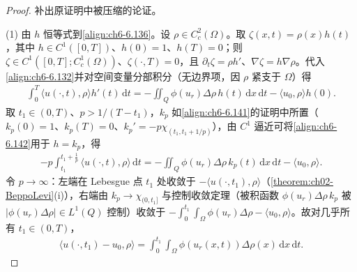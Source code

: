 \documentclass[../../main.tex]{subfiles}%
\begin{document}
\begin{proof}
补出原证明中被压缩的论证。

(1) 由 $h$ 恒等式到\eqref{align:ch6-6.136}。设 $\rho\in C^2_c(\Omega)$。取 $\zeta(x,t)=\rho(x)h(t)$，其中 $h\in C^1([0,T])$、$h(0)=1$、$h(T)=0$；则 $\zeta\in C^1([0,T];C^1_c(\Omega))$、$\zeta(\cdot,T)=0$，且 $\partial_t\zeta=\rho h'$、$\nabla\zeta=h\nabla\rho$。代入\eqref{align:ch6-6.132}并对空间变量分部积分（无边界项，因 $\rho$ 紧支于 $\Omega$）得
\begin{align}
\int_0^T\langle u(\cdot,t),\rho\rangle h'(t)\,\mathrm{d}t
=-\iint_Q\phi(u_r)\Delta\rho\,h(t)\,\mathrm{d}x\,\mathrm{d}t-\langle u_0,\rho\rangle h(0). \label{align:ch6-6.142}
\end{align}
取 $t_1\in(0,T)$、$p>1/(T-t_1)$，$k_p$ 如\eqref{align:ch6-6.141}的证明中所置（$k_p(0)=1$、$k_p(T)=0$、$k_p'=-p\chi_{(t_1,t_1+1/p)}$），由 $C^1$ 逼近可将\eqref{align:ch6-6.142}用于 $h=k_p$，得
\begin{align*}
-p\int_{t_1}^{t_1+\frac{1}{p}}\langle u(\cdot,t),\rho\rangle\,\mathrm{d}t
=-\iint_Q\phi(u_r)\Delta\rho\,k_p(t)\,\mathrm{d}x\,\mathrm{d}t-\langle u_0,\rho\rangle .
\end{align*}
令 $p\to\infty$：左端在 Lebesgue 点 $t_1$ 处收敛于 $-\langle u(\cdot,t_1),\rho\rangle$（\cref{theorem:ch02-BeppoLevi}(i)），右端由 $k_p\to\chi_{(0,t_1]}$ 与控制收敛定理（被积函数 $\phi(u_r)\Delta\rho\,k_p$ 被 $|\phi(u_r)\Delta\rho|\in L^1(Q)$ 控制）收敛于 $-\int_0^{t_1}\int_\Omega\phi(u_r)\Delta\rho-\langle u_0,\rho\rangle$。故对几乎所有 $t_1\in(0,T)$，
\begin{align*}
\langle u(\cdot,t_1)-u_0,\rho\rangle=\int_0^{t_1}\int_\Omega\phi(u_r(x,t))\Delta\rho(x)\,\mathrm{d}x\,\mathrm{d}t .
\end{align*}


\end{proof}
\end{document}
